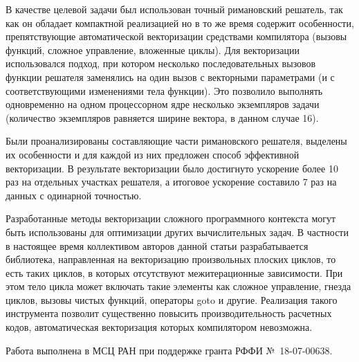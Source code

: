 \documentclass[utf8]{psta}
\begin{document}
В качестве целевой задачи был использован точный римановский решатель, так как он обладает компактной реализацией но в то же время содержит особенности, препятствующие автоматической векторизации средствами компилятора (вызовы функций, сложное управление, вложенные циклы).
Для векторизации использовался подход, при котором несколько последовательных вызовов функции решателя заменялись на один вызов с векторными параметрами (и с соответствующими изменениями тела функции).
Это позволило выполнять одновременно на одном процессорном ядре несколько экземпляров задачи (количество экземпляров равняется ширине вектора, в данном случае 16).

Были проанализированы составляющие части римановского решателя, выделены их особенности и для каждой из них предложен способ эффективной векторизации.
В результате векторизации было достигнуто ускорение более 10 раз на отдельных участках решателя, а итоговое ускорение составило 7 раз на данных с одинарной точностью.

Разработанные методы векторизации сложного программного контекста могут быть использованы для оптимизации других вычислительных задач.
В частности в настоящее время коллективом авторов данной статьи разрабатывается библиотека, направленная на векторизацию произвольных плоских циклов, то есть таких циклов, в которых отсутствуют межитерационные зависимости.
При этом тело цикла может включать такие элементы как сложное управление, гнезда циклов, вызовы чистых функций, операторы goto и другие.
Реализация такого инструмента позволит существенно повысить производительность расчетных кодов, автоматическая векторизация которых компилятором невозможна.

Работа выполнена в МСЦ РАН при поддержке гранта РФФИ №~18-07-00638. 
\end{document}
